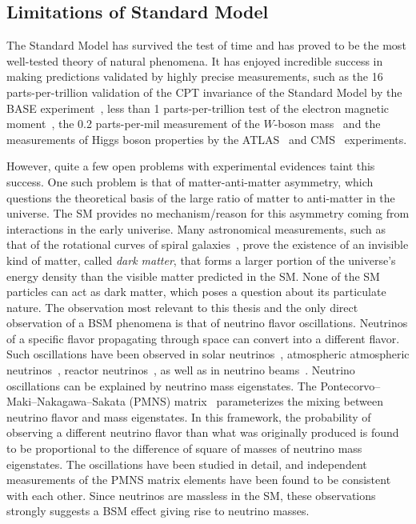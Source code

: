 \subsection{Limitations of Standard Model}
The Standard Model has survived the test of time and has proved to be the most well-tested theory of natural phenomena. It has enjoyed incredible success in making predictions validated by highly precise measurements, such as the 16 parts-per-trillion validation of the CPT invariance of the Standard Model by the BASE experiment~\cite{Borchert2022}, less than 1 parts-per-trillion test of the electron magnetic moment~\cite{PhysRevA.83.052122}, the 0.2 parts-per-mil measurement of the $W$-boson mass~\cite{atlascollaboration2024measurement} and the measurements of Higgs boson properties by the ATLAS~\cite{ATLASNature} and CMS~\cite{CMSNature} experiments.

However, quite a few open problems with experimental evidences taint this success. One such problem is that of matter-anti-matter asymmetry, which questions the theoretical basis of the large ratio of matter to anti-matter in the universe. The SM provides no mechanism/reason for this asymmetry coming from interactions in the early univerise. Many astronomical measurements, such as that of the rotational curves of spiral galaxies~\cite{Begeman:1989kf}, prove the existence of an invisible kind of matter, called \textit{dark matter}, that forms a larger portion of the universe's energy density than the visible matter predicted in the SM. None of the SM particles can act as dark matter, which poses a question about its particulate nature. The observation most relevant to this thesis and the only direct observation of a BSM phenomena is that of neutrino flavor oscillations. Neutrinos of a specific flavor propagating through space can convert into a different flavor. Such oscillations have been observed in solar neutrinos~\cite{PhysRevLett.87.071301}, atmospheric atmospheric neutrinos~\cite{PhysRevLett.81.1562}, reactor neutrinos~\cite{PhysRevLett.108.171803}, as well as in neutrino beams~\cite{PhysRevD.88.032002}. Neutrino oscillations can be explained by neutrino mass eigenstates. The Pontecorvo–Maki–Nakagawa–Sakata (PMNS) matrix~\cite{Maki1962} parameterizes the mixing between neutrino flavor and mass eigenstates. In this framework, the probability of observing a different neutrino flavor than what was originally produced is found to be proportional to the difference of square of masses of neutrino mass eigenstates. The oscillations have been studied in detail, and independent measurements of the PMNS matrix elements have been found to be consistent with each other. Since neutrinos are massless in the SM, these observations strongly suggests a BSM effect giving rise to neutrino masses.

